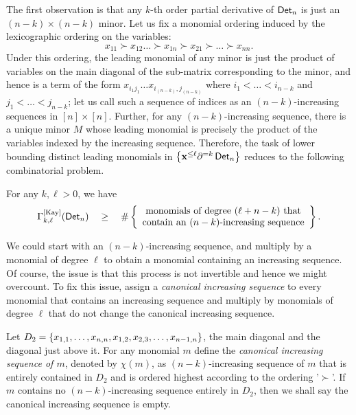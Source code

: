 The first observation is that any $k$-th order partial derivative of $\operatorname{\mathsf{Det}}_n$ is just an $(n-k)\times (n-k)$ minor. 
Let us fix a monomial ordering induced by the lexicographic ordering on the variables:
$$
x_{11} \succ x_{12} \dots \succ x_{1n} \succ x_{21} \succ \dots \succ x_{nn}.
$$
Under this ordering, the leading monomial of any minor is just the product of variables on the main diagonal of the sub-matrix corresponding to the minor, and hence is a term of the form $x_{i_1j_1}\dots x_{i_{(n-k)},j_{(n-k)}}$ where $i_1 < \dots < i_{n-k}$ and $j_1 < \dots < j_{n-k}$; let us call such a sequence of indices as an $(n-k)$-increasing sequences in $[n]\times [n]$. 
Further, for any $(n-k)$-increasing sequence, there is a unique minor $M$ whose leading monomial is precisely the product of the variables indexed by the increasing sequence. 
Therefore, the task of lower bounding distinct leading monomials in $\left\{\mathbf{x}^{\leq \ell}\partial^{=k}\operatorname{\mathsf{Det}}_n\right\}$ reduces to the following combinatorial problem.
\begin{claim} For any $k,\ell > 0$,  we have
$$
\Gamma^{\mathrm{[Kay]}}_{k,\ell}(\operatorname{\mathsf{Det}}_n) \quad \geq \quad \#\left\{\begin{array}{cc}\text{monomials of degree $(\ell + n -k)$ that}\\\text{contain an $(n-k)$-increasing sequence}\end{array}\right\}.
$$
\end{claim}

We could start with an $(n-k)$-increasing sequence, and multiply by a monomial of degree $\ell$ to obtain a monomial containing an increasing sequence. 
Of course, the issue is that this process is not invertible and hence we might overcount. 
To fix this issue, \cite{gkks13} assign a \emph{canonical increasing sequence} to every monomial that contains an increasing sequence and multiply by monomials of degree $\ell$ that do not change the canonical increasing sequence. 

\begin{definition}
Let $D_2 = \left\{x_{1,1},\dots, x_{n,n}, x_{1,2},x_{2,3}, \dots, x_{n-1,n}\right\}$, the main diagonal and the diagonal just above it. 
For any monomial $m$ define the \emph{canonical increasing sequence of $m$}, denoted by $\chi(m)$, as $(n-k)$-increasing sequence of $m$ that is entirely contained in $D_2$ and is ordered highest according to the ordering '$\succ$'. 
If $m$ contains no $(n-k)$-increasing sequence entirely in $D_2$, then we shall say the canonical increasing sequence is empty. 
\end{definition}


